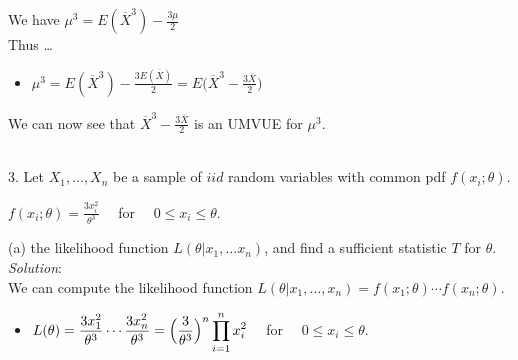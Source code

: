 \documentclass[12pt]{article}
\newcommand{\XB}{\color{black}}
\newcommand{\XBB}{\color{blue}}
\newcommand{\ds}{\displaystyle}
\begin{document}
\noindent
We have $ \ds \mu^{3} = E(\overline{X}^{3}) - \frac{3\mu}{2} $ \\

Thus \dots

\begin{itemize}
    \item $ \ds \mu^{3} = E(\overline{X}^{3}) - \frac{3E(\overline{X})}{2} = E \Biggl( \overline{X}^{3} - \frac{3\overline{X}}{2} \Biggr)$
\end{itemize}

\noindent
We can now see that $ \ds \overline{X}^{3} - \frac{3\overline{X}}{2} $ is an UMVUE for $ \mu^{3} $. \\

\vspace{2.5mm}

\newpage
\XBB\hrulefill\XB \\

3. Let $ X_{1},\dots,X_{n} $ be a sample of $ iid $ random variables with common pdf $ f(x_{i}; \theta) $. \\

\begin{center}
    $ \ds f(x_{i}; \theta) = \frac{3x_{i}^{2}}{\theta^{3}} \quad $ for $ \quad 0 \le x_{i} \le \theta $. 
\end{center}

\XBB\hrulefill\XB 
\vspace{5mm} 

(a) the likelihood function $ L(\theta | x_{1}, \dots x_{n}) $, and find a sufficient statistic $ T $ for $ \theta $.
\vspace{2.5mm} \\
\textit{Solution}:
\vspace{2.5mm} \\ 

\noindent
We can compute the likelihood function $ L(\theta | x_{1}, \dots, x_{n}) = f(x_{1}; \theta) \cdots f(x_{n}; \theta) $. 

\begin{itemize}
    \item $ \ds L(\theta) = \frac{3x_{1}^{2}}{\theta^{3}} \cdots \frac{3x_{n}^{2}}{\theta^{3}} = \Bigl( \frac{3}{\theta^{3}} \Bigr)^{n} \prod_{i=1}^{n} x_{i}^{2} \quad $ for $ \quad 0 \le x_{i} \le \theta $. 
\end{itemize}
\end{document}
